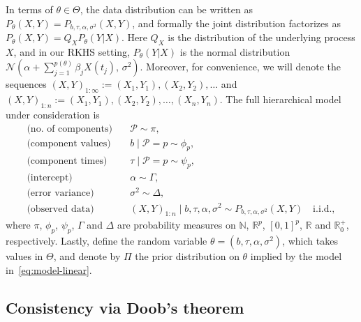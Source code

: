 \documentclass{article}
\numberwithin{equation}{section}
\theoremstyle{plain}
\theoremstyle{definition}
\newcommand{\N}{\mathbb{N}}
\newcommand{\R}{\mathbb{R}}
\begin{document}
In terms of \(\theta\in\Theta\), the data distribution can be written as \(P_\theta(X,Y)=P_{b, \tau, \alpha, \sigma^2}(X,Y)\), and formally the joint distribution  factorizes as \(P_{\theta}(X,Y)=Q_X P_\theta(Y|X)\). Here \(Q_X\) is the distribution of the underlying process \(X\), and in our RKHS setting, \(P_\theta(Y|X)\) is the normal distribution \(\mathcal N(\alpha + \sum_{j=1}^{p(\theta)} \beta_j X(t_j),\, \sigma^2)\). Moreover, for convenience, we will denote the sequences \((X,Y)_{1:\infty} := (X_1, Y_1), (X_2, Y_2), \dots\) and \((X,Y)_{1:n} := (X_1,Y_1), (X_2, Y_2), \dots, (X_n, Y_n)\). The full hierarchical model under consideration is
\begin{equation}\label{eq:model-linear}
  \begin{aligned}
    \text{(no.\ of components)}\quad & \mathcal P \sim \pi,                                                                                    \\
    \text{(component values)}\quad   & b \mid \mathcal P=p \sim \phi_p,                                                                        \\
    \text{(component times)}\quad    & \tau \mid \mathcal P=p \sim \psi_p,                                                                     \\
    \text{(intercept)}\quad          & \alpha \sim \Gamma,                                                                                     \\
    \text{(error variance)}\quad     & \sigma^2 \sim \Delta,                                                                                   \\
    \text{(observed data)}\quad      & (X,Y)_{1:n} \mid b, \tau, \alpha, \sigma^2 \sim P_{b, \tau, \alpha, \sigma^2}(X,Y) \quad \text{i.i.d.},
  \end{aligned}
\end{equation}
where \(\pi\), \(\phi_p\), \(\psi_p\), \(\Gamma\) and \(\Delta\) are probability measures on \(\N\), \(\R^p\), \([0,1]^p\), \(\R\) and \(\R^+_0\), respectively. Lastly, define the random variable \(\theta = (b, \tau, \alpha, \sigma^2)\), which takes values in \(\Theta\), and denote by \(\Pi\) the prior distribution on \(\theta\) implied by the model in~\eqref{eq:model-linear}.

\subsection{Consistency via Doob's theorem}
\end{document}
